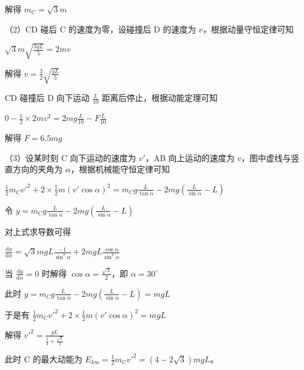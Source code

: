 \documentclass[\gkver]{gaokaozhenti}
\begin{document}
\begin{enumerate}
{	解得 $m_{C}=\sqrt{3}m$

	（2）CD 碰后 C 的速度为零，设碰撞后 D 的速度为 $v$，根据动量守恒定律可知

	$\sqrt{3}m\sqrt{\frac{3gL}{5}}=2mv$

	解得 $v=\frac{3}{2}\sqrt{\frac{gL}{5}}$

	CD 碰撞后 D 向下运动 $\frac{L}{10}$ 距离后停止，根据动能定理可知

	$0-\frac{1}{2}\times 2mv^{2}=2mg\frac{L}{10}-F\frac{L}{10}$

	解得 $F=6.5mg$

	（3）设某时刻 C 向下运动的速度为 $v'$，AB 向上运动的速度为 $v$，图中虚线与竖直方向的夹角为 $\alpha$，根据机械能守恒定律可知

	$\frac{1}{2}m_{C}v'^{2}+2\times\frac{1}{2}m(v'\cos\alpha)^{2}=m_{C}g\frac{L}{\tan\alpha}-2mg\left(\frac{L}{\sin\alpha}-L\right)$

	令 $y=m_{C}g\frac{L}{\tan\alpha}-2mg\left(\frac{L}{\sin\alpha}-L\right)$

	对上式求导数可得

	$\frac{\mathrm{d}y}{\mathrm{d}\alpha}=\sqrt{3}mgL\frac{-1}{\sin^{2}\alpha}+2mgL\frac{\cos\alpha}{\sin^{2}\alpha}$

	当 $\frac{\mathrm{d}y}{\mathrm{d}\alpha}=0$ 时解得 $\cos\alpha=\frac{\sqrt{3}}{2}$，即 $\alpha=30^{\circ}$

	此时 $y=m_{C}g\frac{L}{\tan\alpha}-2mg\left(\frac{L}{\sin\alpha}-L\right)=mgL$

	于是有 $\frac{1}{2}m_{C}v'^{2}+2\times\frac{1}{2}m(v'\cos\alpha)^{2}=mgL$

	解得 $v'^{2}=\frac{gL}{\frac{3}{4}+\frac{\sqrt{3}}{2}}$

	此时 C 的最大动能为 $E_{km}=\frac{1}{2}m_{C}v'^{2}=(4-2\sqrt{3})mgL$。
}

\end{enumerate}
\end{document}
